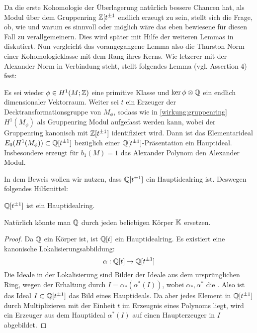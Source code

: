 Da die erste Kohomologie der Überlagerung natürlich bessere Chancen hat, als Modul über dem Gruppenring $\mathbb{Z}[t^{\pm1}$ endlich erzeugt zu sein, stellt sich die Frage, ob, wie und warum es sinnvoll oder möglich wäre das eben bewiesene für diesen Fall zu verallgemeinern. Dies wird später mit Hilfe der weiteren Lemmas in diskutiert. Nun vergleicht das vorangegangene Lemma also die Thurston Norm einer Kohomologieklasse mit dem Rang ihres Kerns. Wie letzerer mit der Alexander Norm in Verbindung steht, stellt folgendes Lemma (vgl. Assertion 4) fest:
\begin{lem}
	\label{lem:charPol}
	Es sei wieder $\phi \in H^1(M;\mathbb{Z})$ eine primitive Klasse und $\ker \phi \otimes \mathbb{Q}$ ein endlich dimensionaler Vektorraum. Weiter sei $t$ ein Erzeuger der Decktransformationsgruppe von $M_\phi$, sodass wie in \ref{wirkung:gruppenring} $H^1(M_\phi)$ als Gruppenring Modul aufgefasst werden kann, wobei der Gruppenring kanonisch mit $\mathbb{Z}[t^{\pm 1}]$ identifiziert wird. Dann ist das Elementarideal $E_0(H^1(M_\phi))\subset \mathbb{Q}[t^{\pm1}]$ bezüglich einer $\mathbb{Q}[t^{\pm 1}]$-Präsentation ein Hauptideal.\\
	Insbesondere erzeugt für $b_1(M)=1$ das Alexander Polynom den Alexander Modul.
\end{lem}
In dem Beweis wollen wir nutzen, dass $\mathbb{Q}[t^{\pm 1}]  $ ein Hauptidealring ist. Deswegen folgendes Hilfsmittel:
\begin{lem}
	$\mathbb{Q}[t^{\pm 1}]$ ist ein Hauptidealring.
\end{lem}
Natürlich könnte man $\mathbb{Q}$ durch jeden beliebigen Körper $\mathbb{K}$ ersetzen.
\begin{proof}
	Da $\mathbb{Q}$ ein Körper ist, ist $\mathbb{Q}[t]$ ein Hauptidealring. Es existiert eine kanonische Lokalisierungsabbildung:
	\[
		\alpha : \mathbb{Q}[t] \to \mathbb{Q}[t^{\pm 1}]
	\]
	Die Ideale in der Lokalisierung sind Bilder der Ideale aus dem ursprünglichen Ring, wegen der Erhaltung durch $I=\alpha_*(\alpha^*(I))$, wobei $\alpha_*,\alpha^*$ die . Also ist das Ideal $I\subset \mathbb{Q}[t^{\pm 1}]$ das Bild eines Hauptideals. Da aber jedes Element in $\mathbb{Q}[t^{\pm 1}]$ durch Multiplizieren mit der Einheit $t$ im Erzeugnis eines Polynoms liegt, wird ein Erzeuger aus dem Hauptideal $\alpha^*(I)$ auf einen Haupterzeuger in $I$ abgebildet.	
\end{proof}
